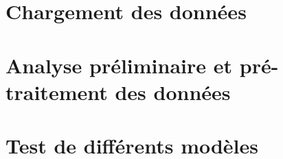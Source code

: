 \documentclass[12pt,a4paper]{article}
\numberwithin{equation}{section}
\begin{document}
	\hrulefill

	\tableofcontents
	
	\newpage
	
	\section{Chargement des données}
	
	\section{Analyse préliminaire et pré-traitement des données}
	
	\section{Test de différents modèles}
	
	
\end{document}
